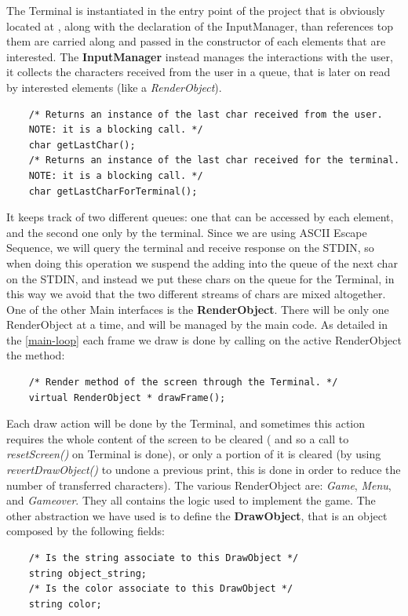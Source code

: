 \documentclass{article}
\begin{document}
The Terminal is instantiated in the entry point of the project that is obviously located at , along with the declaration of the InputManager, than references top them are carried along and passed in the constructor of each
elements that are interested.
The \textbf{InputManager} instead manages the interactions with the user, it collects the characters received from the user in a queue, that is later on read by interested elements (like a \textit{RenderObject}).
\begin{verbatim}
    /* Returns an instance of the last char received from the user.
    NOTE: it is a blocking call. */
    char getLastChar();
    /* Returns an instance of the last char received for the terminal.
    NOTE: it is a blocking call. */
    char getLastCharForTerminal();
\end{verbatim}
It keeps track of two different queues: one that can be accessed by each element, and the second one only by the terminal. Since we are using ASCII Escape Sequence, we will query the terminal and receive response on the STDIN, so when doing this operation we suspend the adding into the queue of the next char on the STDIN,
and instead we put these chars on the queue for the Terminal, in this way we avoid that the two different streams of chars are mixed altogether.
One of the other Main interfaces is the \textbf{RenderObject}. There will be only one RenderObject at a time, and will be managed by the main code.
As detailed in the \ref{main-loop} each frame we draw is done by calling on the active RenderObject the method:
\begin{verbatim}
    /* Render method of the screen through the Terminal. */
    virtual RenderObject * drawFrame();
\end{verbatim}
Each draw action will be done by the Terminal, and sometimes this action requires the whole content of the screen to be cleared ( and so a call to \textit{resetScreen()} on Terminal is done), or only a portion of it is cleared (by using \textit{revertDrawObject()} to undone a previous print, this is done in order to reduce the number of transferred characters).
The various RenderObject are: \textit{Game}, \textit{Menu}, and \textit{Gameover}.
They all contains the logic used to implement the game.
The other abstraction we have used is to define the \textbf{DrawObject}, that is an object composed by the following fields:
\begin{verbatim}
    /* Is the string associate to this DrawObject */
    string object_string;
    /* Is the color associate to this DrawObject */
    string color;
\end{verbatim}
\end{document}
